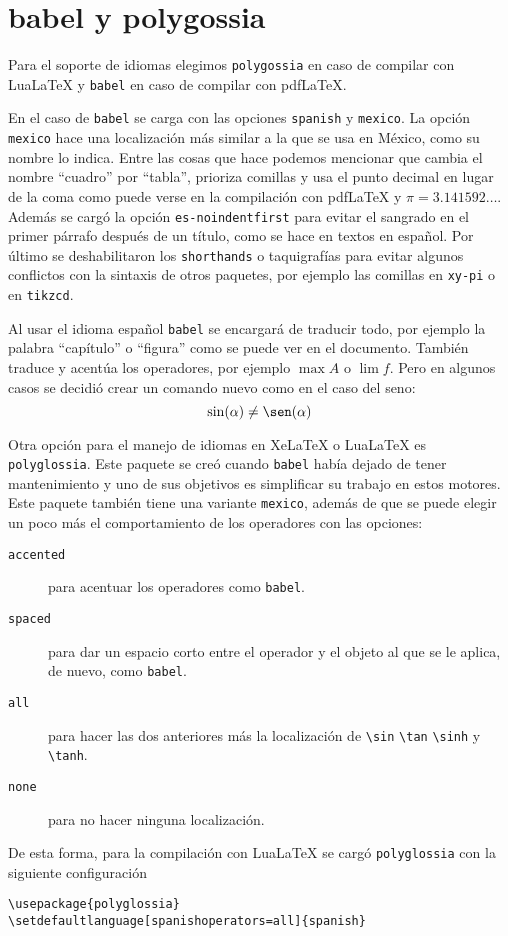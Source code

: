 \section{babel y polygossia}%
\label{sec:babel}
Para el soporte de idiomas elegimos \texttt{polygossia} en caso de compilar
con Lua\LaTeX{} y \texttt{babel} en caso de compilar con pdf\LaTeX.

En el caso de \texttt{babel} se carga con las opciones \texttt{spanish} y
\texttt{mexico}. La opción \texttt{mexico} hace una localización más similar
a la que se usa en México, como su nombre lo indica. Entre las cosas que
hace podemos mencionar que cambia el nombre ``cuadro'' por ``tabla'',
prioriza comillas y usa el punto decimal en lugar de la coma como puede
verse en la compilación con pdf\LaTeX{} y \(\pi=3.141592\ldots \). Además se
cargó la opción \texttt{es-noindentfirst} para evitar el sangrado en el
primer párrafo después de un título, como se hace en textos en español. Por
último se deshabilitaron los \texttt{shorthands} o taquigrafías para evitar
algunos conflictos con la sintaxis de otros paquetes, por ejemplo las
comillas en \texttt{xy-pi} o en \texttt{tikzcd}.

Al usar el idioma español \texttt{babel} se encargará de traducir todo, por
ejemplo la palabra ``capítulo'' o ``figura'' como se puede ver en el
documento. También traduce y acentúa los operadores, por ejemplo \(\max A\)
o \(\lim f\).%
\ifpdftex%
Pero en algunos casos se decidió crear un comando nuevo como en el caso del
seno:
\[
  \sin(\alpha)\ne\sen(\alpha)
\]
\fi

Otra opción para el manejo de idiomas en Xe\LaTeX{} o Lua\LaTeX{} es
\texttt{polyglossia}. Este paquete se creó cuando \texttt{babel} había
dejado de tener mantenimiento y uno de sus objetivos es simplificar su
trabajo en estos motores. Este paquete también tiene una variante
\texttt{mexico}, además de que se puede elegir un poco más el comportamiento
de los operadores con las opciones:
\begin{description}
  \item[\texttt{accented}] para acentuar los operadores como \texttt{babel}.
  \item[\texttt{spaced}] para dar un espacio corto entre el operador y el objeto al que se le aplica, de nuevo, como \texttt{babel}.
  \item[\texttt{all}] para hacer las dos anteriores más la localización de \verb|\sin| \verb|\tan| \verb|\sinh| y \verb|\tanh|.
  \item[\texttt{none}] para no hacer ninguna localización.
\end{description}
De esta forma, para la compilación con Lua\LaTeX{} se cargó
\texttt{polyglossia} con la siguiente configuración
\begin{flushleft}
  \verb|\usepackage{polyglossia}| \\
  \verb|\setdefaultlanguage[spanishoperators=all]{spanish}|
\end{flushleft}

